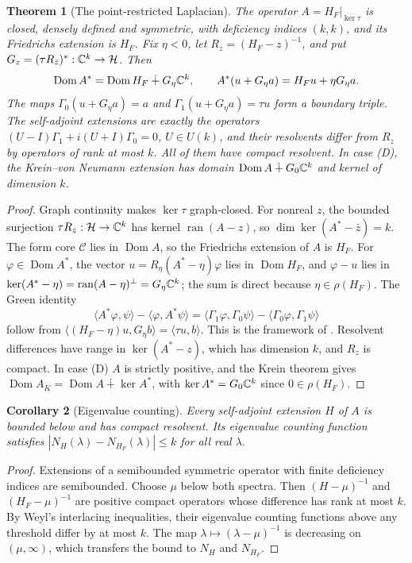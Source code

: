 \documentclass[11pt]{article}
\newtheorem{theorem}{Theorem}[section]
\newtheorem{corollary}[theorem]{Corollary}
\theoremstyle{definition}\newtheorem{definition}[theorem]{Definition}
\theoremstyle{remark}\newtheorem{remark}[theorem]{Remark}
\newcommand{\Dom}{\operatorname{Dom}}\newcommand{\dd}{\,d}
\newcommand{\cH}{\mathcal H}\newcommand{\cV}{\mathcal V}\newcommand{\inte}{\operatorname{int}}
\begin{document}
\begin{theorem}[The point-restricted Laplacian]\label{thm:triple}
The operator $A=H_F|_{\ker\tau}$ is closed, densely defined and symmetric, with
deficiency indices $(k,k)$, and its Friedrichs extension is $H_F$. Fix
$\eta<0$, let $R_z=(H_F-z)^{-1}$, and put $G_z=(\tau R_{\bar z})^*:\C^k\to\cH$.
Then
\[
 \Dom A^*=\Dom H_F\dotplus G_\eta\C^k,\qquad A^*(u+G_\eta a)=H_Fu+\eta G_\eta a.
\]
The maps $\Gamma_0(u+G_\eta a)=a$ and $\Gamma_1(u+G_\eta a)=\tau u$ form a
boundary triple. The self-adjoint extensions are exactly the operators
$(U-I)\Gamma_1+i(U+I)\Gamma_0=0$, $U\in U(k)$, and their resolvents differ from
$R_z$ by operators of rank at most $k$. All of them have compact resolvent. In
case (D), the Krein--von Neumann extension has domain
$\Dom A\dotplus G_0\C^k$ and kernel of dimension $k$.
\end{theorem}
\begin{proof}
Graph continuity makes $\ker\tau$ graph-closed. For nonreal $z$, the bounded
surjection $\tau R_z:\cH\to\C^k$ has kernel $\operatorname{ran}(A-z)$, so
$\dim\ker(A^*-\bar z)=k$. The form core $\mathcal C$ lies in $\Dom A$, so the
Friedrichs extension of $A$ is $H_F$. For $\varphi\in\Dom A^*$, the vector
$u=R_\eta(A^*-\eta)\varphi$ lies in $\Dom H_F$, and $\varphi-u$ lies in
$\ker(A^*-\eta)=\operatorname{ran}(A-\eta)^\perp=G_\eta\mathbb C^k$; the sum is direct
because $\eta\in\rho(H_F)$. The Green identity
\[
 \langle A^*\varphi,\psi\rangle-\langle \varphi,A^*\psi\rangle
 =\langle\Gamma_1\varphi,\Gamma_0\psi\rangle-\langle\Gamma_0\varphi,\Gamma_1\psi\rangle
\]
follow from $\langle(H_F-\eta)u,G_\eta b\rangle=\langle\tau u,b\rangle$. This is
the framework of \cite{pos}. Resolvent differences have range in
$\ker(A^*-z)$, which has dimension $k$, and $R_z$ is compact. In case (D) $A$
is strictly positive, and the Krein theorem \cite[Thm.~2.1]{krein} gives
$\Dom A_K=\Dom A\dotplus\ker A^*$, with $\ker A^*=G_0\mathbb C^k$ since $0\in\rho(H_F)$.
\end{proof}

\begin{corollary}[Eigenvalue counting]\label{cor:counting}
Every self-adjoint extension $H$ of $A$ is bounded below and has compact
resolvent. Its eigenvalue counting function satisfies
$|N_H(\lambda)-N_{H_F}(\lambda)|\leq k$ for all real $\lambda$.
\end{corollary}
\begin{proof}
Extensions of a semibounded symmetric operator with finite deficiency indices
are semibounded. Choose $\mu$ below both spectra. Then $(H-\mu)^{-1}$ and
$(H_F-\mu)^{-1}$ are positive compact operators whose difference has rank at
most $k$. By Weyl's interlacing inequalities, their eigenvalue counting
functions above any threshold differ by at most $k$. The map
$\lambda\mapsto(\lambda-\mu)^{-1}$ is decreasing on $(\mu,\infty)$, which
transfers the bound to $N_H$ and $N_{H_F}$.
\end{proof}
\end{document}
